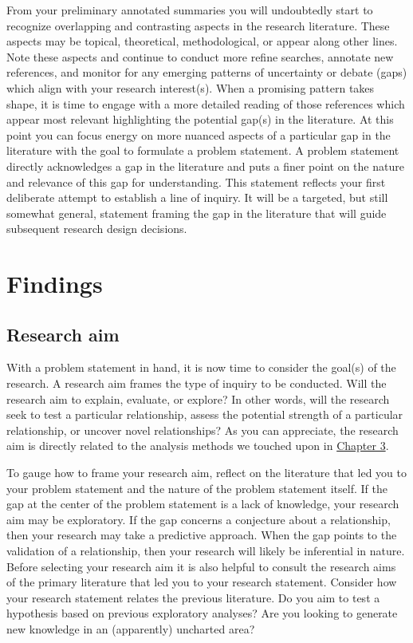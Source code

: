 \documentclass[
  letterpaper,
]{scrbook}
\begin{document}
From your preliminary annotated summaries you will undoubtedly start to
recognize overlapping and contrasting aspects in the research
literature. These aspects may be topical, theoretical, methodological,
or appear along other lines. Note these aspects and continue to conduct
more refine searches, annotate new references, and monitor for any
emerging patterns of uncertainty or debate (gaps) which align with your
research interest(s). When a promising pattern takes shape, it is time
to engage with a more detailed reading of those references which appear
most relevant highlighting the potential gap(s) in the literature. At
this point you can focus energy on more nuanced aspects of a particular
gap in the literature with the goal to formulate a problem statement. A
problem statement directly acknowledges a gap in the literature and puts
a finer point on the nature and relevance of this gap for understanding.
This statement reflects your first deliberate attempt to establish a
line of inquiry. It will be a targeted, but still somewhat general,
statement framing the gap in the literature that will guide subsequent
research design decisions.

\hypertarget{findings}{%
\section{Findings}\label{findings}}

\hypertarget{research-aim}{%
\subsection{Research aim}\label{research-aim}}

With a problem statement in hand, it is now time to consider the goal(s)
of the research. A research aim frames the type of inquiry to be
conducted. Will the research aim to explain, evaluate, or explore? In
other words, will the research seek to test a particular relationship,
assess the potential strength of a particular relationship, or uncover
novel relationships? As you can appreciate, the research aim is directly
related to the analysis methods we touched upon in
\protect\hyperlink{sec-approaching-analysis}{Chapter 3}.

To gauge how to frame your research aim, reflect on the literature that
led you to your problem statement and the nature of the problem
statement itself. If the gap at the center of the problem statement is a
lack of knowledge, your research aim may be exploratory. If the gap
concerns a conjecture about a relationship, then your research may take
a predictive approach. When the gap points to the validation of a
relationship, then your research will likely be inferential in nature.
Before selecting your research aim it is also helpful to consult the
research aims of the primary literature that led you to your research
statement. Consider how your research statement relates the previous
literature. Do you aim to test a hypothesis based on previous
exploratory analyses? Are you looking to generate new knowledge in an
(apparently) uncharted area?
\end{document}
